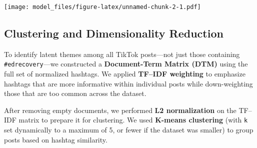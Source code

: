 \documentclass[
]{article}
\newenvironment{Shaded}{\begin{snugshade}}{\end{snugshade}}
\newcommand{\AttributeTok}[1]{\textcolor[rgb]{0.13,0.29,0.53}{#1}}
\newcommand{\CommentTok}[1]{\textcolor[rgb]{0.56,0.35,0.01}{\textit{#1}}}
\newcommand{\ConstantTok}[1]{\textcolor[rgb]{0.56,0.35,0.01}{#1}}
\newcommand{\DecValTok}[1]{\textcolor[rgb]{0.00,0.00,0.81}{#1}}
\newcommand{\FloatTok}[1]{\textcolor[rgb]{0.00,0.00,0.81}{#1}}
\newcommand{\FunctionTok}[1]{\textcolor[rgb]{0.13,0.29,0.53}{\textbf{#1}}}
\newcommand{\NormalTok}[1]{#1}
\newcommand{\OtherTok}[1]{\textcolor[rgb]{0.56,0.35,0.01}{#1}}
\newcommand{\SpecialCharTok}[1]{\textcolor[rgb]{0.81,0.36,0.00}{\textbf{#1}}}
\newcommand{\StringTok}[1]{\textcolor[rgb]{0.31,0.60,0.02}{#1}}
\begin{document}
\begin{Shaded}
\end{Shaded}

\texttt{[image: model\_files/figure-latex/unnamed-chunk-2-1.pdf]}

\subsection{Clustering and Dimensionality
Reduction}\label{clustering-and-dimensionality-reduction}

To identify latent themes among all TikTok posts---not just those
containing \texttt{\#edrecovery}---we constructed a
\textbf{Document-Term Matrix (DTM)} using the full set of normalized
hashtags. We applied \textbf{TF--IDF weighting} to emphasize hashtags
that are more informative within individual posts while down-weighting
those that are too common across the dataset.

After removing empty documents, we performed \textbf{L2 normalization}
on the TF--IDF matrix to prepare it for clustering. We used
\textbf{K-means clustering} (with \texttt{k} set dynamically to a
maximum of 5, or fewer if the dataset was smaller) to group posts based
on hashtag similarity.
\end{document}
